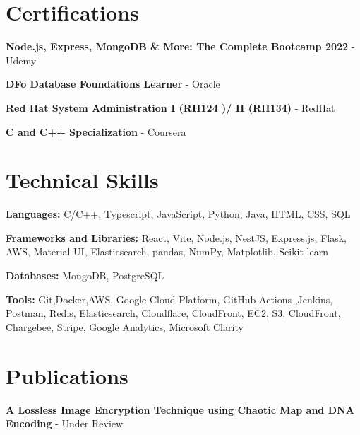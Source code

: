 \documentclass[a4paper,11pt]{article}
\begin{document}
\section{Certifications}
\begin{itemize}[leftmargin=0.15in, label={},itemsep=0pt,parsep=0pt]
	\small{
	\item{
	      \textbf{Node.js, Express, MongoDB \& More: The Complete Bootcamp 2022}{ - Udemy}}
	\item{
	      \textbf{DFo Database Foundations Learner}{ - Oracle}
	      }
	\item{
	      \textbf{Red Hat System Administration I (RH124 )/ II (RH134)}{ - RedHat}
	      }
	\item {
	      \textbf{C and C++ Specialization}{ - Coursera}
	      }
	      }
\end{itemize}
\section{Technical Skills}
\begin{itemize}[leftmargin=0.15in, label={}, itemsep=0pt, parsep=0pt]
	\small{
	\item{
	      \textbf{Languages:} C/C++, Typescript, JavaScript, Python, Java, HTML, CSS, SQL
	      }
	\item{
	      \textbf{Frameworks and Libraries:} React, Vite, Node.js, NestJS, Express.js, Flask, AWS, Material-UI, Elasticsearch, pandas, NumPy, Matplotlib, Scikit-learn
	      }
	\item{
	      \textbf{Databases:} MongoDB, PostgreSQL
	      }
	\item{
	      \textbf{Tools:} Git,Docker,AWS, Google Cloud Platform, GitHub Actions ,Jenkins, Postman, Redis, Elasticsearch, Cloudflare, CloudFront, EC2, S3, CloudFront, Chargebee, Stripe, Google Analytics, Microsoft Clarity
	      }

	      }
\end{itemize}

\section{Publications}
\begin{itemize}[leftmargin=0.15in, label={},itemsep=0pt,parsep=0pt]
	\small{
	\item{
	      \textbf{A Lossless Image Encryption Technique using Chaotic Map and DNA Encoding} - Under Review
	      }
	      }
\end{itemize}
\end{document}
